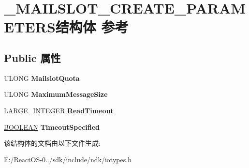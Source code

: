\hypertarget{struct___m_a_i_l_s_l_o_t___c_r_e_a_t_e___p_a_r_a_m_e_t_e_r_s}{}\section{\+\_\+\+M\+A\+I\+L\+S\+L\+O\+T\+\_\+\+C\+R\+E\+A\+T\+E\+\_\+\+P\+A\+R\+A\+M\+E\+T\+E\+R\+S结构体 参考}
\label{struct___m_a_i_l_s_l_o_t___c_r_e_a_t_e___p_a_r_a_m_e_t_e_r_s}
\subsection*{Public 属性}
\begin{DoxyCompactItemize}
\item 
\mbox{\label{struct___m_a_i_l_s_l_o_t___c_r_e_a_t_e___p_a_r_a_m_e_t_e_r_s_a8d0ab20b43c326b3d55d19b9d7e0ffc0}} 
U\+L\+O\+NG {\bfseries Mailslot\+Quota}
\item 
\mbox{\label{struct___m_a_i_l_s_l_o_t___c_r_e_a_t_e___p_a_r_a_m_e_t_e_r_s_ab6297502c2be2f4923a56bac4a833ecf}} 
U\+L\+O\+NG {\bfseries Maximum\+Message\+Size}
\item 
\mbox{\label{struct___m_a_i_l_s_l_o_t___c_r_e_a_t_e___p_a_r_a_m_e_t_e_r_s_a9a1096d3a7f27e65e860c07c57bc512d}} 
\hyperlink{union___l_a_r_g_e___i_n_t_e_g_e_r}{L\+A\+R\+G\+E\+\_\+\+I\+N\+T\+E\+G\+ER} {\bfseries Read\+Timeout}
\item 
\mbox{\label{struct___m_a_i_l_s_l_o_t___c_r_e_a_t_e___p_a_r_a_m_e_t_e_r_s_a7ab7cdcfaf17c7b91fb84678077ad743}} 
\hyperlink{_processor_bind_8h_a112e3146cb38b6ee95e64d85842e380a}{B\+O\+O\+L\+E\+AN} {\bfseries Timeout\+Specified}
\end{DoxyCompactItemize}


该结构体的文档由以下文件生成\+:\begin{DoxyCompactItemize}
\item 
E\+:/\+React\+O\+S-\/0../sdk/include/ndk/iotypes.\+h\end{DoxyCompactItemize}
